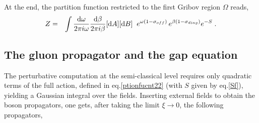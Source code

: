 At the end, the partition function restricted to the first Gribov region $\Omega$ reads,
\begin{eqnarray}
Z &=&  \int \frac{\mathrm{d} \omega}{2\pi i \omega}\frac{\mathrm{d} \beta}{2\pi i \beta} [\mathrm{d} A] [\mathrm{d} B]  \; \; e^{\omega (1-\sigma_{off})} \, e^{\beta (1-\sigma_{diag})} e^{-S}\;.
\label{ptionfucnt22}
\end{eqnarray}














\subsection{The gluon propagator and the gap equation}



The perturbative computation at the semi-classical level requires only quadratic terms of the full action, defined in eq.\eqref{ptionfucnt22} (with $S$ given by eq.\eqref{Sf}), yielding a Gaussian integral over the fields. Inserting external fields to obtain the boson propagators, one gets, after taking the limit $\xi \to 0$, the following propagators,


